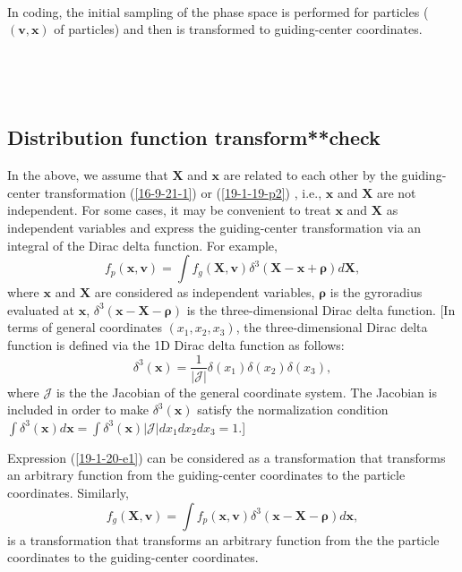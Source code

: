 \documentclass{llncs}
\newcommand{\tmmathbf}[1]{\ensuremath{\boldsymbol{#1}}}
\begin{document}
\

In coding, the initial sampling of the phase space is performed for particles
($(\mathbf{v}, \mathbf{x})$ of particles) and then is transformed to
guiding-center coordinates.

\

\

\subsection{Distribution function transform**check}

In the above, we assume that $\mathbf{X}$ and $\mathbf{x}$ are related to each
other by the guiding-center transformation (\ref{16-9-21-1}) or
(\ref{19-1-19-p2}) , i.e., $\mathbf{x}$ and $\mathbf{X}$ are not independent.
For some cases, it may be convenient to treat $\mathbf{x}$ and $\mathbf{X}$ as
independent variables and express the guiding-center transformation via an
integral of the Dirac delta function. For example,
\begin{equation}
  \label{19-1-20-e1} f_p (\mathbf{x}, \mathbf{v}) = \int f_g (\mathbf{X},
  \mathbf{v}) \delta^3 (\mathbf{X}-\mathbf{x}+\tmmathbf{\rho}) d\mathbf{X},
\end{equation}
where $\mathbf{x}$ and $\mathbf{X}$ are considered as independent variables,
$\tmmathbf{\rho}$ is the gyroradius evaluated at $\mathbf{x}$, $\delta^3
(\mathbf{x}-\mathbf{X}-\tmmathbf{\rho})$ is the three-dimensional Dirac delta
function. [In terms of general coordinates $(x_1, x_2, x_3)$, the
three-dimensional Dirac delta function is defined via the 1D Dirac delta
function as follows:
\begin{equation}
  \delta^3 (\mathbf{x}) = \frac{1}{| \mathcal{J} |} \delta (x_1) \delta (x_2)
  \delta (x_3),
\end{equation}
where $\mathcal{J}$ is the the Jacobian of the general coordinate system. The
Jacobian is included in order to make $\delta^3 (\mathbf{x})$ satisfy the
normalization condition $\int \delta^3 (\mathbf{x}) d\mathbf{x}= \int \delta^3
(\mathbf{x}) | \mathcal{J} | d x_1 d x_2 d x_3 = 1$.]

Expression (\ref{19-1-20-e1}) can be considered as a transformation that
transforms an arbitrary function from the guiding-center coordinates to the
particle coordinates. Similarly,
\begin{equation}
  f_g (\mathbf{X}, \mathbf{v}) = \int f_p (\mathbf{x}, \mathbf{v}) \delta^3
  (\mathbf{x}-\mathbf{X}-\tmmathbf{\rho}) d\mathbf{x},
\end{equation}
is a transformation that transforms an arbitrary function from the the
particle coordinates to the guiding-center coordinates.
\end{document}
